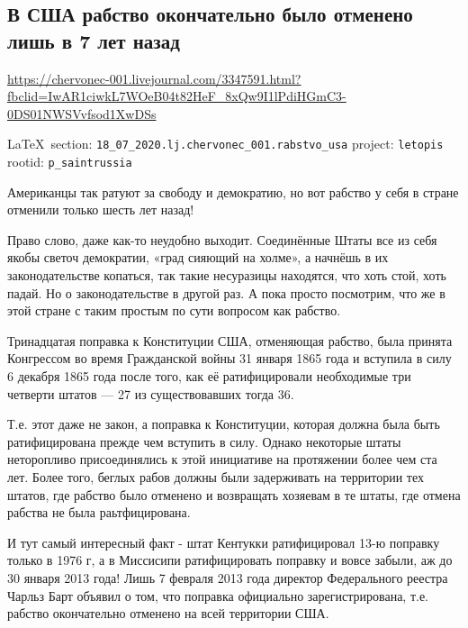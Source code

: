  
 
\subsection{В США рабство окончательно было отменено лишь в 7 лет назад}
\label{sec:18_07_2020.lj.chervonec_001.rabstvo_usa}
\url{https://chervonec-001.livejournal.com/3347591.html?fbclid=IwAR1ciwkL7WOeB04t82HeF_8xQw9I1lPdiHGmC3-0DS01NWSVvfsod1XwDSs}
  
\vspace{0.5cm}
{\small\LaTeX~section: \verb|18_07_2020.lj.chervonec_001.rabstvo_usa| project: \verb|letopis| rootid: \verb|p_saintrussia|}
\vspace{0.5cm}

Американцы так ратуют за свободу и демократию, но вот рабство у себя в стране
отменили только шесть лет назад!

Право слово, даже как-то неудобно выходит. Соединённые Штаты все из себя якобы
светоч демократии, «град сияющий на холме», а начнёшь в их законодательстве
копаться, так такие несуразицы находятся, что хоть стой, хоть падай. Но о
законодательстве в другой раз. А пока просто посмотрим, что же в этой стране с
таким простым по сути вопросом как рабство.

Тринадцатая поправка к Конституции США, отменяющая рабство, была принята
Конгрессом во время Гражданской войны 31 января 1865 года и вступила в силу 6
декабря 1865 года после того, как её ратифицировали необходимые три четверти
штатов — 27 из существовавших тогда 36.

Т.е. этот даже не закон, а поправка к Конституции, которая должна была быть
ратифицирована прежде чем вступить в силу. Однако некоторые штаты неторопливо
присоединялись к этой инициативе на протяжении более чем ста лет. Более того,
беглых рабов должны были задерживать на территории тех штатов, где рабство было
отменено и возвращать хозяевам в те штаты, где отмена рабства не была
раьтфицирована.

И тут самый интересный факт - штат Кентукки ратифицировал 13-ю поправку только
в 1976 г, а в Миссисипи ратифицировать поправку и вовсе забыли, аж до 30 января
2013 года! Лишь 7 февраля 2013 года директор Федерального реестра Чарльз Барт
объявил о том, что поправка официально зарегистрирована, т.е. рабство
окончательно отменено на всей территории США.

